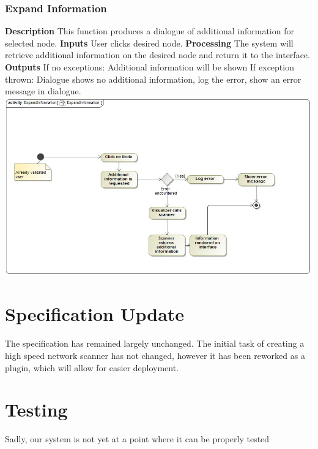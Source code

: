 \documentclass[hidelinks,a4paper,12pt]{article}
\begin{document}
		\subsubsection{Expand Information}
		\textbf{Description}
		\newline
		This function produces a dialogue of additional information for selected node.
		\textbf{Inputs}
		\newline
		User clicks desired node.
		\newline
		\textbf{Processing}
		\newline
		The system will retrieve additional information on the desired node and return it to the interface.
		\newline
		\textbf{Outputs}
		\newline
		If no exceptions:
		\newline
		Additional information will be shown
		\newline
		If exception thrown:
		\newline
		Dialogue shows no additional information, log the error, show an error message in dialogue.
		\newline
		\includegraphics[width=1.00\textwidth]{./images/ExpandInformation.png}\\[0.4cm] 
	
	
	
\newpage
\section{Specification Update}
	The specification has remained largely unchanged. The initial task of creating a high speed network scanner has not changed, however it has been reworked as a plugin, which will allow for easier deployment.
\section{Testing}
	Sadly, our system is not yet at a point where it can be properly tested


















	
\end{document}
